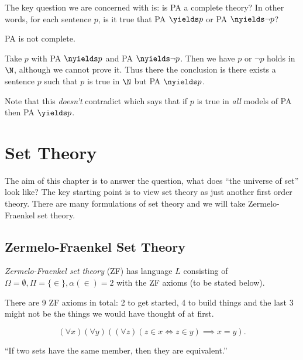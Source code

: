 \documentclass[a4paper]{article}
\begin{document}
The key question we are concerned with is: is PA a complete theory? In other words, for each sentence \(p\), is it true that PA \(\yields p\) or PA \(\nyields \neg p\)?

\begin{theorem}
  PA is not complete.
\end{theorem}

Take \(p\) with PA \(\nyields p\) and PA \(\nyields \neg p\). Then we have \(p\) or \(\neg p\) holds in \(\N\), although we cannot prove it. Thus there the conclusion is there exists a sentence \(p\) such that \(p\) is true in \(\N\) but PA \(\nyields p\).

Note that this \emph{doesn't} contradict  which says that if \(p\) is true in \emph{all} models of PA then PA \(\yields p\).

\section{Set Theory}

The aim of this chapter is to answer the question, what does ``the universe of set'' look like? The key starting point is to view set theory as just another first order theory. There are many formulations of set theory and we will take Zermelo-Fraenkel set theory.

\subsection{Zermelo-Fraenkel Set Theory}

\begin{definition}
  \emph{Zermelo-Fraenkel set theory} (ZF) has language \(L\) consisting of \(\Omega = \emptyset, \Pi = \{\in\}, \alpha(\in) = 2\) with the ZF axioms (to be stated below).
\end{definition}

There are 9 ZF axioms in total: 2 to get started, 4 to build things and the last 3 might not be the things we would have thought of at first.

\begin{axiom*}
  \[
    (\forall x) (\forall y) ((\forall z) (z \in x \iff z \in y) \implies x = y).
  \]
\end{axiom*}
``If two sets have the same member, then they are equivalent.''
\end{document}
